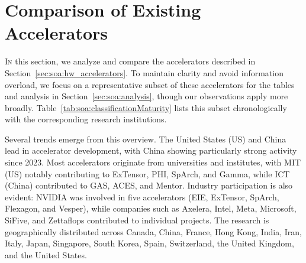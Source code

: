 
\section{Comparison of Existing Accelerators}
\label{sec:soa:comparison_and_analysis}

\lettrine{I}{n} this section, we analyze and compare the accelerators described in Section~\ref{sec:soa:hw_accelerators}.
To maintain clarity and avoid information overload, we focus on a representative subset of these accelerators for the tables and analysis in Section~\ref{sec:soa:analysis}, though our observations apply more broadly.
Table~\ref{tab:soa:classificationMaturity} lists this subset chronologically with the corresponding research institutions.

Several trends emerge from this overview.
The United States (US) and China lead in accelerator development, with China showing particularly strong activity since 2023.
Most accelerators originate from universities and institutes, with MIT (US) notably contributing to ExTensor, PHI, SpArch, and Gamma, while ICT (China) contributed to GAS, ACES, and Mentor.
Industry participation is also evident: NVIDIA was involved in five accelerators (\eg EIE, ExTensor, SpArch, Flexagon, and Vesper), while companies such as Axelera, Intel, Meta, Microsoft, SiFive, and Zettaflops contributed to individual projects.
The research is geographically distributed across Canada, China, France, Hong Kong, India, Iran, Italy, Japan, Singapore, South Korea, Spain, Switzerland, the United Kingdom, and the United States.

